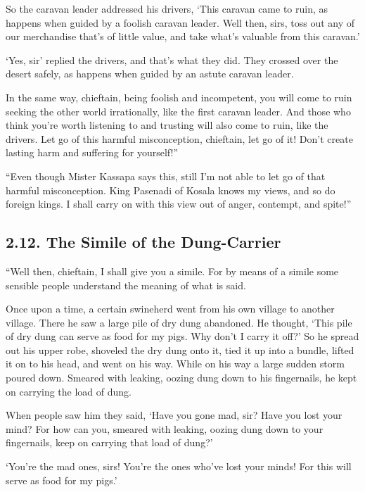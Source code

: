 \documentclass[12pt,openany]{book}%
\begin{document}
So the caravan leader addressed his drivers, ‘This caravan came to ruin, as happens when guided by a foolish caravan leader. Well then, sirs, toss out any of our merchandise that’s of little value, and take what’s valuable from this caravan.’ 

‘Yes, sir’ replied the drivers, and that’s what they did. They crossed over the desert safely, as happens when guided by an astute caravan leader. 

In the same way, chieftain, being foolish and incompetent, you will come to ruin seeking the other world irrationally, like the first caravan leader. And those who think you’re worth listening to and trusting will also come to ruin, like the drivers. Let go of this harmful misconception, chieftain, let go of it! Don’t create lasting harm and suffering for yourself!” 

“Even though Mister Kassapa says this, still I’m not able to let go of that harmful misconception. King Pasenadi of Kosala knows my views, and so do foreign kings. I shall carry on with this view out of anger, contempt, and spite!” 

\subsection*{2.12. The Simile of the Dung-Carrier }

“Well then, chieftain, I shall give you a simile. For by means of a simile some sensible people understand the meaning of what is said. 

Once upon a time, a certain swineherd went from his own village to another village. There he saw a large pile of dry dung abandoned. He thought, ‘This pile of dry dung can serve as food for my pigs. Why don’t I carry it off?’ So he spread out his upper robe, shoveled the dry dung onto it, tied it up into a bundle, lifted it on to his head, and went on his way. While on his way a large sudden storm poured down. Smeared with leaking, oozing dung down to his fingernails, he kept on carrying the load of dung. 

When people saw him they said, ‘Have you gone mad, sir? Have you lost your mind? For how can you, smeared with leaking, oozing dung down to your fingernails, keep on carrying that load of dung?’ 

‘You’re the mad ones, sirs! You’re the ones who’ve lost your minds! For this will serve as food for my pigs.’ 
\end{document}
